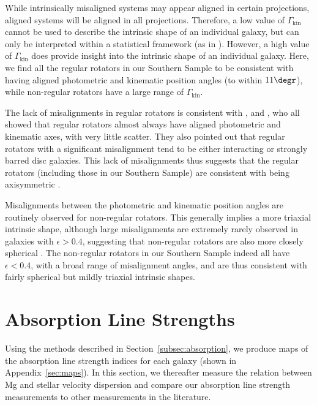 \documentclass[a4paper,fleqn,usenatbib]{mnras}
\begin{document}
While intrinsically misaligned systems may appear aligned in certain
projections, aligned systems will be aligned in all
projections. Therefore, a low value of $\Gamma_\text{kin}$ cannot be
used to describe the intrinsic shape of an individual galaxy, but can
only be interpreted within a statistical framework (as in
\citealt{Cappellari2007}). However, a high value of
$\Gamma_\text{kin}$ does provide insight into the intrinsic shape of
an individual galaxy. Here, we find all the regular rotators in our
Southern Sample to be consistent with having aligned photometric and
kinematic position angles (to within $11\degr$), while non-regular
rotators have a large range of $\Gamma_\text{kin}$.

The lack of misalignments in regular rotators is consistent with
\citet{Cappellari2007}, \citet{Krajnovic2011} and \citet{Fogarty2015},
who all showed that regular rotators almost always have aligned
photometric and kinematic axes, with very little scatter. They also
pointed out that regular rotators with a significant misalignment tend
to be either interacting or strongly barred disc galaxies. This lack
of misalignments thus suggests that the regular rotators (including
those in our Southern Sample) are consistent with being axisymmetric
\citep{Cappellari2016}.

Misalignments between the photometric and kinematic position angles
are routinely observed for non-regular rotators. This generally
implies a more triaxial intrinsic shape, although large misalignments
are extremely rarely observed in galaxies with $\epsilon>0.4$,
suggesting that non-regular rotators are also more closely spherical
\citep{Cappellari2016}. The non-regular rotators in our Southern
Sample indeed all have $\epsilon<0.4$, with a broad range of
misalignment angles, and are thus consistent with fairly spherical
but mildly triaxial intrinsic shapes.

\section{Absorption Line Strengths}
\label{sec:absorption}

Using the methods described in Section~\ref{subsec:absorption}, we
produce maps of the absorption line strength indices for each galaxy
(shown in Appendix~\ref{sec:maps}). In this section, we thereafter
measure the relation between Mg and stellar velocity dispersion and
compare our absorption line strength measurements to other
measurements in the literature.
\end{document}
